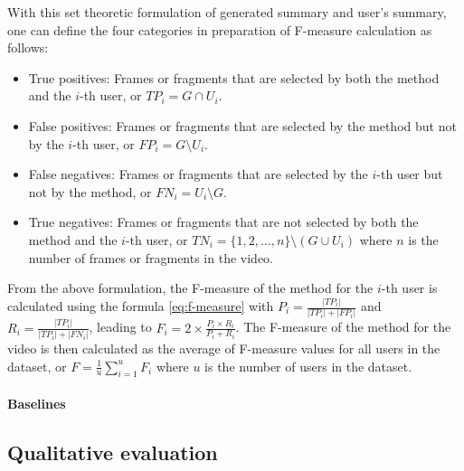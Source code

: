             With this set theoretic formulation of generated summary and user's summary, one can define the four categories in preparation of F-measure calculation as follows:

            \begin{itemize}
                \item True positives: Frames or fragments that are selected by both the method and the $i$-th user, or $TP_i = G \cap U_i$.
                \item False positives: Frames or fragments that are selected by the method but not by the $i$-th user, or $FP_i = G \setminus U_i$.
                \item False negatives: Frames or fragments that are selected by the $i$-th user but not by the method, or $FN_i = U_i \setminus G$.
                \item True negatives: Frames or fragments that are not selected by both the method and the $i$-th user, or $TN_i = \{1, 2, ..., n\} \setminus (G \cup U_i)$ where $n$ is the number of frames or fragments in the video.
            \end{itemize}

            From the above formulation, the F-measure of the method for the $i$-th user is calculated using the formula \ref{eq:f-measure} with $P_i = \frac{|TP_i|}{|TP_i| + |FP_i|}$ and $R_i = \frac{|TP_i|}{|TP_i| + |FN_i|}$, leading to $F_i = 2 \times \frac{P_i \times R_i}{P_i + R_i}$. The F-measure of the method for the video is then calculated as the average of F-measure values for all users in the dataset, or $F = \frac{1}{u} \sum_{i=1}^{u} F_i$ where $u$ is the number of users in the dataset.
            

    \paragraph[long]{Baselines}

\subsection{Qualitative evaluation}
\label{subsec:exp-evaluation-qualitative}

    